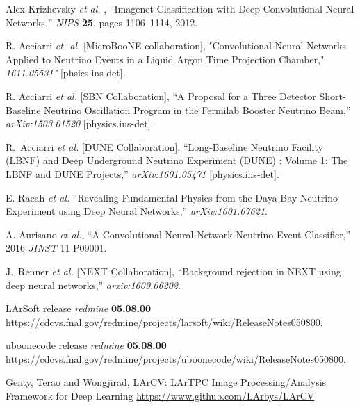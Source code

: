 \documentclass[11pt,a4paper]{article}
\begin{document}
\newpage
%
\begin{thebibliography}{9}

  Alex Krizhevsky {\it et al. },
  ``Imagenet Classification with Deep Convolutional Neural Networks,''
  \emph{NIPS} \textbf{25}, pages 1106–1114, 2012.

R. Acciarri {\it et. al.} [MicroBooNE collaboration],
"Convolutional Neural Networks Applied to Neutrino Events in a Liquid Argon Time Projection Chamber,"
\emph{1611.05531"} [phsics.ins-det].

R. Acciarri {\it et al.} [SBN Collaboration],
``A Proposal for a Three Detector Short-Baseline Neutrino Oscillation Program in the Fermilab Booster Neutrino Beam,''
\emph{arXiv:1503.01520} [physics.ins-det].

R.~Acciarri {\it et al.} [DUNE Collaboration],
  ``Long-Baseline Neutrino Facility (LBNF) and Deep Underground Neutrino Experiment (DUNE) : Volume 1: The LBNF and DUNE Projects,''
  \emph{arXiv:1601.05471} [physics.ins-det].

E. Racah {\it et al.} ``Revealing Fundamental Physics from the Daya Bay Neutrino Experiment using Deep Neural Networks,'' \emph{arXiv:1601.07621}.

A. Aurisano {\it et al.}, ``A Convolutional Neural Network Neutrino Event Classifier,'' 2016 \emph{JINST} 11 P09001.

J.~Renner {\it et al.} [NEXT Collaboration],
``Background rejection in NEXT using deep neural networks,''
\emph{arxiv:1609.06202}.

LArSoft release {\it redmine} \textbf{05.08.00} \protect\url{https://cdcvs.fnal.gov/redmine/projects/larsoft/wiki/ReleaseNotes050800}.

uboonecode release {\it redmine} \textbf{05.08.00} \protect\url{https://cdcvs.fnal.gov/redmine/projects/uboonecode/wiki/ReleaseNotes050800}.

 Genty, Terao and Wongjirad, LArCV: LArTPC Image Processing/Analysis Framework for Deep Learning \protect\url{https://www.github.com/LArbys/LArCV} %
 

\end{thebibliography}
\end{document}
